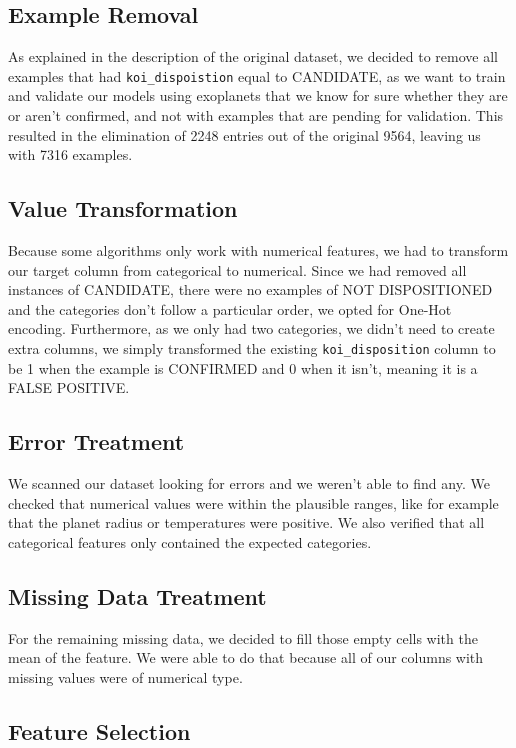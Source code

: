 \subsection{Example Removal}

As explained in the description of the original dataset, we decided to remove all 
examples that had \texttt{koi\_dispoistion} equal to CANDIDATE, as we want to
train and validate our models using exoplanets that we know for sure whether
they are or aren't confirmed, and not with examples that are pending for validation.
This resulted in the elimination of 2248 entries out of the original 9564, 
leaving us with 7316 examples.

\subsection{Value Transformation}

Because some algorithms only work with numerical features, we had to transform our
target column from categorical to numerical. Since we had removed all instances of
CANDIDATE, there were no examples of NOT DISPOSITIONED and the categories don't follow
a particular order, we opted for One-Hot encoding. Furthermore, as we only had two
categories, we didn't need to create extra columns, we simply transformed the existing
\texttt{koi\_disposition} column to be 1 when the example is CONFIRMED and 0 when
it isn't, meaning it is a FALSE POSITIVE.

\subsection{Error Treatment}

We scanned our dataset looking for errors and we weren't able to find any. We checked
that numerical values were within the plausible ranges, like for example that the
planet radius or temperatures were positive. We also verified that all categorical 
features only contained the expected categories.

\subsection{Missing Data Treatment}

For the remaining missing data, we decided to fill those empty cells with the mean
of the feature. We were able to do that because all of our columns with missing values
were of numerical type.

\subsection{Feature Selection}%
\label{sub:feature_removal}

